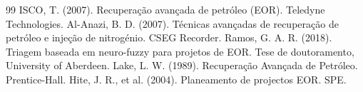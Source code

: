 \documentclass[11pt,a4paper]{article}
\begin{document}
\begin{thebibliography}{99}
 ISCO, T. (2007). Recuperação avançada de petróleo (EOR). Teledyne Technologies.
 Al-Anazi, B. D. (2007). Técnicas avançadas de recuperação de petróleo e injeção de nitrogénio. CSEG Recorder.
 Ramos, G. A. R. (2018). Triagem baseada em neuro-fuzzy para projetos de EOR. Tese de doutoramento, University of Aberdeen.
 Lake, L. W. (1989). Recuperação Avançada de Petróleo. Prentice-Hall.
 Hite, J. R., et al. (2004). Planeamento de projectos EOR. SPE.
\end{thebibliography}
\end{document}
